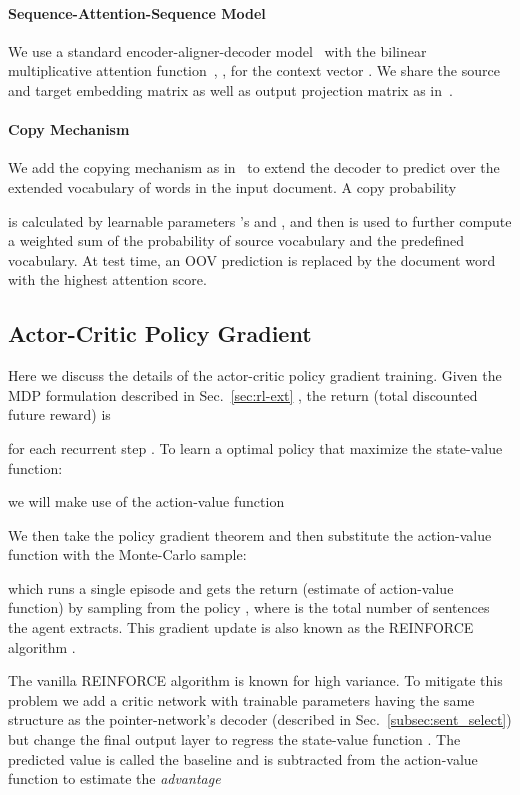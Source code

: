 \documentclass[11pt,a4paper]{article}
\def\secref#1{Sec.~\ref{#1}}
\begin{document}
\paragraph{Sequence-Attention-Sequence Model}
We use a standard encoder-aligner-decoder model~\cite{bahdanau+al-2014-nmt,luong-pham-manning:2015:EMNLP} with the bilinear multiplicative attention function~\cite{luong-pham-manning:2015:EMNLP}, 
, for the context vector .
We share the source and target embedding matrix  as well as output projection matrix as in~\citet{DBLP:journals/corr/InanKS16,E17-2025:output_embedding,DBLP:journals/corr/PaulusXS17}. 


\paragraph{Copy Mechanism}
We add the copying mechanism as in~\citet{get_to_the_point} to
extend the decoder to predict over
 the extended vocabulary of words in the input document.
A copy probability 
  
is calculated by learnable parameters 's and , and then is used to further compute 
a weighted sum of the probability of source vocabulary and the predefined vocabulary.
At test time, an OOV prediction is replaced by the document word with the highest 
attention score.

\subsection{Actor-Critic Policy Gradient}
\label{sec:pg}
Here we discuss the details of the actor-critic policy gradient training.
Given the MDP formulation described in \secref{sec:rl-ext}
, the return (total discounted future reward) is

for each recurrent step .
To learn a optimal policy  that maximize the state-value function:

we will make use of the action-value function

We then take the policy gradient theorem and then substitute the action-value function with the Monte-Carlo sample:

which runs a single episode and gets the return (estimate of action-value function) by sampling from the policy , 
where  is the total number of sentences the agent extracts.
This gradient update is also known as the REINFORCE algorithm \citep{Williams:1992:SSG:139611.139614}.

The vanilla REINFORCE algorithm is known for high variance. 
To mitigate this problem we add a critic network with trainable parameters  having the same structure as the pointer-network's decoder (described in \secref{subsec:sent_select}) but change the final output layer to regress the state-value function .
The predicted value  is called the baseline and is subtracted from the action-value function to estimate the \textit{advantage}
 
\end{document}
